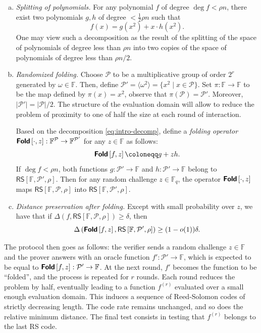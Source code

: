 \documentclass[10pt,a4paper]{article}
\newcommand\F{\mathbb{F}}
\newcommand\Fq{\mathbb{F}_q}
\newcommand\fold[1]{\textsf{\textbf{Fold}}\left[#1\right]}
\newcommand\RS[1]{\mathsf{RS}\left[\F,#1\right]}
\newcommand{\size}[1]{\left|#1\right|}
\newcommand\calP{\mathcal{P}}
\newcommand\mydef{\coloneqq}
\theoremstyle{plain}
\theoremstyle{plain}
\theoremstyle{definition}
\theoremstyle{remark}
\theoremstyle{plain}
\begin{document}
\begin{enumerate}[a)]
	\item\label{it:split} \emph{Splitting of polynomials.} For any polynomial $f$ of degree $\deg f < \rho n$, there exist two polynomials $g,  h$ of degree $< \frac{1}{2} \rho n$ such that 
	\begin{equation}\label{eq:intro-decomp}
		f(x) = g\left(x^2\right) + x \cdot h\left(x^2\right).
	\end{equation}
	One may view such a decomposition as the result of the splitting of the space of polynomials of degree less than $\rho n$ into two copies of the space of polynomials of degree less than $\rho n/2$. 
	
	\item\label{it:fold} \emph{Randomized folding.}
	Choose $\calP$ to be a multiplicative group of order $2^r$ generated by $\omega \in \F$. Then, define $\calP' = \langle \omega^2 \rangle = \{x^2 \mid x \in \calP\}$. Set $\pi : \F \rightarrow \F$ to be the map defined by $\pi(x) = x^2$, observe that $\pi(\calP) = \calP'$. Moreover, $\size{\calP'} = \size{\calP}/2$. The structure of the evaluation domain will allow to reduce the problem of proximity to one of half the size at each round of interaction.
	
	Based on the decomposition \eqref{eq:intro-decomp}, define a \emph{folding operator} $\fold{\cdot,z} : \F^\calP \rightarrow \F^{\calP'}$ for any $z \in \F$ as follows:
	\[\fold{f,z} \mydef g + zh.\]
	If $\deg f < \rho n$, both functions $g : \calP' \rightarrow \F$ and $h : \calP' \rightarrow \F$ belong to $\RS{\calP', \rho}$. Then for any random challenge $z\in \Fq$, the operator $\fold{\cdot, z}$ maps $\RS{\calP,\rho}$ into $\RS{\calP',\rho}$.
	
	\item\label{it:dist} \emph{Distance preservation after folding.} Except with small probability over $z$, we have that if $\Delta(f, \RS{\calP, \rho}) \ge \delta$, then \[\Delta\left(\fold{f, z}, \RS{\calP', \rho}\right) \ge (1 - o(1))\delta.\]
\end{enumerate}

The protocol then goes as follows: the verifier sends a random challenge $z \in \F$ and the prover answers with an oracle function $f' : \calP' \rightarrow \F$, which is expected to be equal to $\fold{f,z} : \calP' \rightarrow \F$. At the next round, $f'$ becomes the function to be ``folded'', and the process is repeated for $r$ rounds. Each round reduces the problem by half, eventually leading to a function $f^{(r)}$ evaluated over a small enough evaluation domain. This induces a sequence of Reed-Solomon codes of strictly decreasing length. The code rate remains unchanged, and so does the relative minimum distance. The final test consists in testing that $f^{(r)}$ belongs to the last RS code. 
\end{document}
